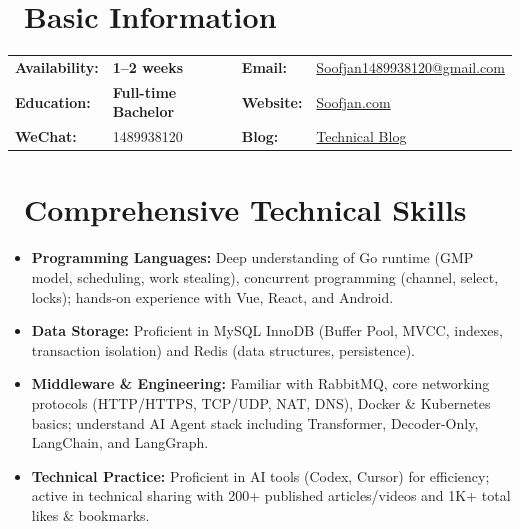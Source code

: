 \documentclass{resume}
\begin{document}


\section{\faInfoCircle\ Basic Information}
\vspace{0.5ex}
\begin{minipage}{0.72\textwidth}
    \large
    \begin{tabular}{@{}l@{}p{}@{}l@{}p{}@{}}
        \textbf{Availability:} & \textbf{1--2 weeks} &
        \textbf{Email:} & \href{mailto:Soofjan1489938120@gmail.com}{Soofjan1489938120\allowbreak{}@gmail.com} \\
        \textbf{Education:} & \textbf{Full-time Bachelor} &
        \textbf{Website:} & \href{https://Soofjan.com}{Soofjan.com} \\
        \textbf{WeChat:} & 1489938120 &
        \textbf{Blog:} & \href{https://juejin.cn/user/4074147977125020}{Technical Blog} \\
    \end{tabular}
\end{minipage}

\section{\faCogs\ Comprehensive Technical Skills}
\begin{itemize}
    \item \textbf{Programming Languages:} Deep understanding of Go runtime (GMP model, scheduling, work stealing), concurrent programming (channel, select, locks); hands-on experience with Vue, React, and Android.
    \item \textbf{Data Storage:} Proficient in MySQL InnoDB (Buffer Pool, MVCC, indexes, transaction isolation) and Redis (data structures, persistence).
    \item \textbf{Middleware \& Engineering:} Familiar with RabbitMQ, core networking protocols (HTTP/HTTPS, TCP/UDP, NAT, DNS), Docker \& Kubernetes basics; understand AI Agent stack including Transformer, Decoder-Only, LangChain, and LangGraph.
    \item \textbf{Technical Practice:} Proficient in AI tools (Codex, Cursor) for efficiency; active in technical sharing with 200+ published articles/videos and 1K+ total likes \& bookmarks.
\end{itemize}
\end{document}
